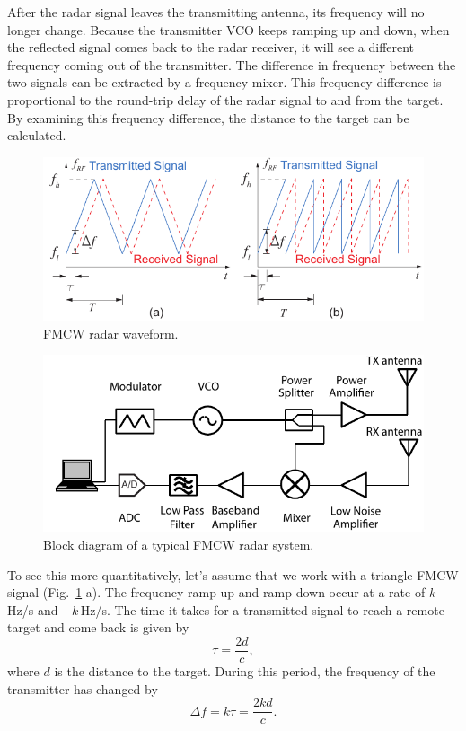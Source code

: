 \documentclass[letterpaper, 11pt]{article}
\begin{document}
After the radar signal leaves the transmitting antenna, its frequency will no longer change. Because the transmitter VCO keeps ramping up and down, when the reflected signal comes back to the radar receiver, it will see a different frequency coming out of the transmitter. The difference in frequency between the two signals can be extracted by a frequency mixer. This frequency difference is proportional to the round-trip delay of the radar signal to and from the target. By examining this frequency difference, the distance to the target can be calculated.

\begin{figure}[ht]
	\centering
	\includegraphics{fmcwwaveform}
	\caption{FMCW radar waveform.}
	\label{fig:fmcwwaveform}
\end{figure} 

\begin{figure}[ht]
	\centering
	\includegraphics{fmcwsystem}
	\caption{Block diagram of a typical FMCW radar system.}
	\label{fig:fmcwsystem}
\end{figure} 

To see this more quantitatively, let's assume that we work with a triangle FMCW signal (Fig.~\ref{fig:fmcwwaveform}-a). The frequency ramp up and ramp down occur at a rate of $k$\,Hz/s and $-k$\,Hz/s. The time it takes for a transmitted signal to reach a remote target and come back is given by 
\[
\tau = \frac{2d}{c},
\]
where $d$ is the distance to the target. During this period, the frequency of the transmitter has changed by 
\[ 
\Delta f = k\tau = \frac{2kd}{c}.
\] 
\end{document}

